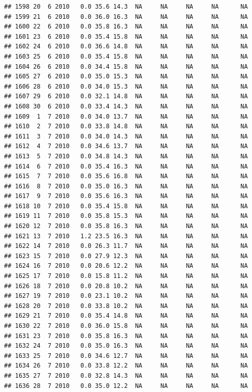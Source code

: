 \documentclass[
]{book}
\begin{document}
\begin{verbatim}
## 1598 20  6 2010   0.0 35.6 14.3  NA     NA     NA     NA      NA
## 1599 21  6 2010   0.0 36.0 16.3  NA     NA     NA     NA      NA
## 1600 22  6 2010   0.0 35.8 16.3  NA     NA     NA     NA      NA
## 1601 23  6 2010   0.0 35.4 15.8  NA     NA     NA     NA      NA
## 1602 24  6 2010   0.0 36.6 14.8  NA     NA     NA     NA      NA
## 1603 25  6 2010   0.0 35.4 15.8  NA     NA     NA     NA      NA
## 1604 26  6 2010   0.0 34.4 15.8  NA     NA     NA     NA      NA
## 1605 27  6 2010   0.0 35.0 15.3  NA     NA     NA     NA      NA
## 1606 28  6 2010   0.0 34.0 15.3  NA     NA     NA     NA      NA
## 1607 29  6 2010   0.0 32.1 14.8  NA     NA     NA     NA      NA
## 1608 30  6 2010   0.0 33.4 14.3  NA     NA     NA     NA      NA
## 1609  1  7 2010   0.0 34.0 13.7  NA     NA     NA     NA      NA
## 1610  2  7 2010   0.0 33.8 14.8  NA     NA     NA     NA      NA
## 1611  3  7 2010   0.0 34.0 14.3  NA     NA     NA     NA      NA
## 1612  4  7 2010   0.0 34.6 13.7  NA     NA     NA     NA      NA
## 1613  5  7 2010   0.0 34.8 14.3  NA     NA     NA     NA      NA
## 1614  6  7 2010   0.0 35.4 16.3  NA     NA     NA     NA      NA
## 1615  7  7 2010   0.0 35.6 16.8  NA     NA     NA     NA      NA
## 1616  8  7 2010   0.0 35.0 16.3  NA     NA     NA     NA      NA
## 1617  9  7 2010   0.0 35.6 16.3  NA     NA     NA     NA      NA
## 1618 10  7 2010   0.0 35.4 15.8  NA     NA     NA     NA      NA
## 1619 11  7 2010   0.0 35.8 15.3  NA     NA     NA     NA      NA
## 1620 12  7 2010   0.0 35.8 16.3  NA     NA     NA     NA      NA
## 1621 13  7 2010   1.2 23.5 16.3  NA     NA     NA     NA      NA
## 1622 14  7 2010   0.0 26.3 11.7  NA     NA     NA     NA      NA
## 1623 15  7 2010   0.0 27.9 12.3  NA     NA     NA     NA      NA
## 1624 16  7 2010   0.0 20.6 12.2  NA     NA     NA     NA      NA
## 1625 17  7 2010   0.0 15.8 11.2  NA     NA     NA     NA      NA
## 1626 18  7 2010   0.0 20.8 10.2  NA     NA     NA     NA      NA
## 1627 19  7 2010   0.0 23.1 10.2  NA     NA     NA     NA      NA
## 1628 20  7 2010   0.0 33.8 10.2  NA     NA     NA     NA      NA
## 1629 21  7 2010   0.0 35.4 14.8  NA     NA     NA     NA      NA
## 1630 22  7 2010   0.0 36.0 15.8  NA     NA     NA     NA      NA
## 1631 23  7 2010   0.0 35.8 16.3  NA     NA     NA     NA      NA
## 1632 24  7 2010   0.0 35.0 16.3  NA     NA     NA     NA      NA
## 1633 25  7 2010   0.0 34.6 12.7  NA     NA     NA     NA      NA
## 1634 26  7 2010   0.0 33.8 12.2  NA     NA     NA     NA      NA
## 1635 27  7 2010   0.0 32.8 14.3  NA     NA     NA     NA      NA
## 1636 28  7 2010   0.0 35.0 12.2  NA     NA     NA     NA      NA

\end{verbatim}
\end{document}
